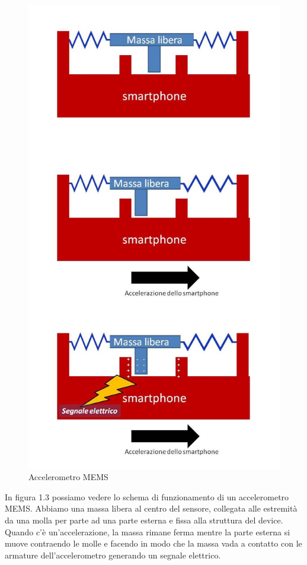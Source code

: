 \documentclass[12pt,a4paper,openright,twoside]{report}
\begin{document}
\begin{figure}[h!]
\centering 
\includegraphics[scale=0.2]{fig4} 
\caption{Accelerometro MEMS} 
\end{figure}
In figura 1.3 possiamo vedere lo schema di funzionamento di un accelerometro MEMS. Abbiamo una massa libera al centro del sensore, collegata alle estremità da una molla per parte ad una parte esterna e fissa alla struttura del device. Quando c'è un'accelerazione, la massa rimane ferma mentre la parte esterna si muove contraendo le molle e facendo in modo che la massa vada a contatto con le armature dell'accelerometro generando un segnale elettrico. 
\end{document}
